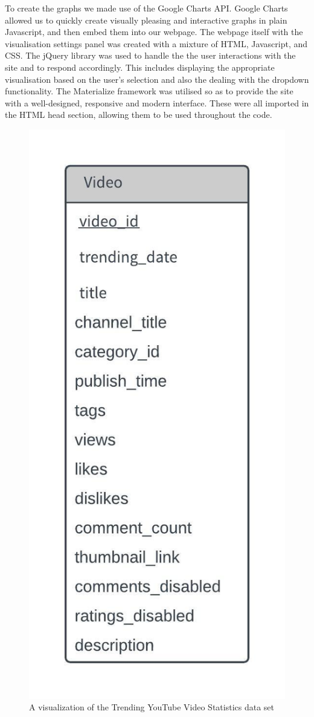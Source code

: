 \documentclass[journal]{vgtc}                %
\begin{document}
To create the graphs we made use of the Google Charts API. Google Charts allowed us to quickly create visually pleasing and interactive graphs in plain Javascript, and then embed them into our webpage. The webpage itself with the visualisation settings panel was created with a mixture of HTML, Javascript, and CSS. The jQuery library was used to handle the the user interactions with the site and to respond accordingly. This includes displaying the appropriate visualisation based on the user’s selection and also the dealing with the dropdown functionality. The Materialize framework was utilised so as to provide the site with a well-designed, responsive and modern interface. These were all imported in the HTML head section, allowing them to be used throughout the code.
 

\begin{figure}[tb]
 \centering %
 \includegraphics[width=0.6\columnwidth]{erd}
 \caption{A visualization of the Trending YouTube Video Statistics data set}
 \label{fig:data}
\end{figure}
\end{document}
